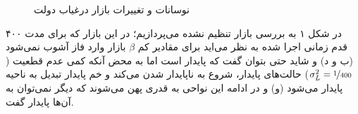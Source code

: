 \documentclass[13pt,onecolumn,a4paper]{article}
\begin{document}
\begin{figure}[H]
		\medskip
		\hfil
		\caption{نوسانات و تغییرات بازار درغیاب دولت }
		\label{fig:myfigure}
	\end{figure}
در شکل ۱ به بررسی بازار تنظیم نشده می‌پردازیم؛ در این بازار که برای مدت ۴۰۰ قدم زمانی اجرا شده به نظر می‌اید برای مقادیر کم $\beta$ بازار وارد فاز آشوب نمی‌شود (ب و د) و شاید حتی بتوان گفت که پایدار است اما به محض آنکه کمی عدم قطعیت ($\sigma_L^2=\nicefrac{1}{400}$) حالت‌های پایدار، شروع به ناپایدار شدن می‌کند و خم پایدار تبدیل به ناحیه پایدار می‌شود (و) و در ادامه این نواحی به قدری پهن می‌شوند که دیگر نمی‌توان به آن‌ها پایدار گفت.
\end{document}

